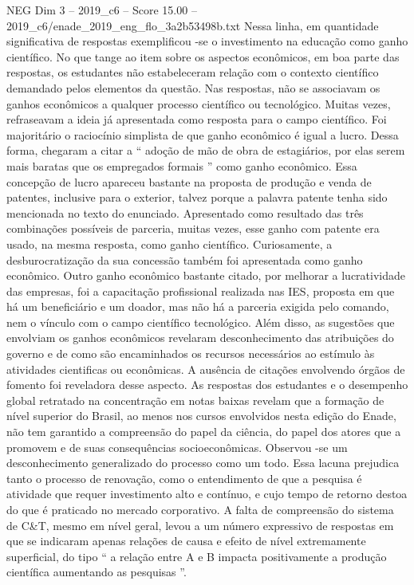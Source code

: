 \begin{textsample}{NEG Dim 3 – 2019\_c6 – Score 15.00 – 2019\_c6/enade\_2019\_eng\_flo\_3a2b53498b.txt}
Nessa linha, em quantidade significativa de respostas exemplificou -se o investimento na educação como ganho científico.
No que tange ao item sobre os aspectos econômicos, em boa parte das respostas, os estudantes não estabeleceram relação com o contexto científico demandado pelos elementos da questão.
Nas respostas, não se associavam os ganhos econômicos a qualquer processo científico ou tecnológico.
Muitas vezes, refraseavam a ideia já apresentada como resposta para o campo científico.
Foi majoritário o raciocínio simplista de que ganho econômico é igual a lucro.
Dessa forma, chegaram a citar a “ adoção de mão de obra de estagiários, por elas serem mais baratas que os empregados formais ” como ganho econômico.
Essa concepção de lucro apareceu bastante na proposta de produção e venda de patentes, inclusive para o exterior, talvez porque a palavra patente tenha sido mencionada no texto do enunciado.
Apresentado como resultado das três combinações possíveis de parceria, muitas vezes, esse ganho com patente era usado, na mesma resposta, como ganho científico.
Curiosamente, a desburocratização da sua concessão também foi apresentada como ganho econômico.
Outro ganho econômico bastante citado, por melhorar a lucratividade das empresas, foi a capacitação profissional realizada nas IES, proposta em que há um beneficiário e um doador, mas não há a parceria exigida pelo comando, nem o vínculo com o campo científico tecnológico.
Além disso, as sugestões que envolviam os ganhos econômicos revelaram desconhecimento das atribuições do governo e de como são encaminhados os recursos necessários ao estímulo às atividades cientificas ou econômicas.
A ausência de citações envolvendo órgãos de fomento foi reveladora desse aspecto.
As respostas dos estudantes e o desempenho global retratado na concentração em notas baixas revelam que a formação de nível superior do Brasil, ao menos nos cursos envolvidos nesta edição do Enade, não tem garantido a compreensão do papel da ciência, do papel dos atores que a promovem e de suas consequências socioeconômicas.
Observou -se um desconhecimento generalizado do processo como um todo.
Essa lacuna prejudica tanto o processo de renovação, como o entendimento de que a pesquisa é atividade que requer investimento alto e contínuo, e cujo tempo de retorno destoa do que é praticado no mercado corporativo.
A falta de compreensão do sistema de C\&T, mesmo em nível geral, levou a um número expressivo de respostas em que se indicaram apenas relações de causa e efeito de nível extremamente superficial, do tipo “ a relação entre A e B impacta positivamente a produção científica aumentando as pesquisas ”.

\end{textsample}
